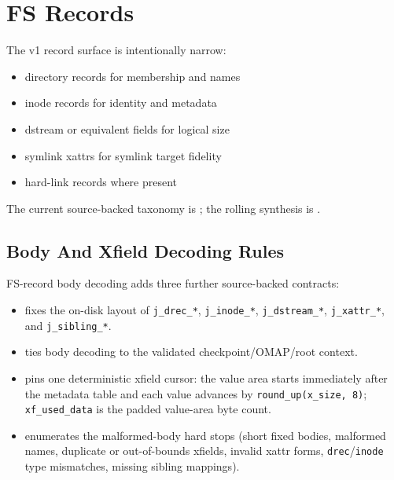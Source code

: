 \section{FS Records}

The v1 record surface is intentionally narrow:

\begin{itemize}
  \item directory records for membership and names
  \item inode records for identity and metadata
  \item dstream or equivalent fields for logical size
  \item symlink xattrs for symlink target fidelity
  \item hard-link records where present
\end{itemize}

The current source-backed taxonomy is
; the rolling synthesis
is .

\subsection{Body And Xfield Decoding Rules}

FS-record body decoding adds three further source-backed contracts:

\begin{itemize}
  \item {} fixes the
  on-disk layout of \texttt{j\_drec\_*}, \texttt{j\_inode\_*},
  \texttt{j\_dstream\_*}, \texttt{j\_xattr\_*}, and \texttt{j\_sibling\_*}.
  \item {}
  ties body decoding to the validated checkpoint/OMAP/root context.
  \item {}
  pins one deterministic xfield cursor: the value area starts immediately
  after the metadata table and each value advances by
  \texttt{round\_up(x\_size, 8)}; \texttt{xf\_used\_data} is the padded
  value-area byte count.
  \item {}
  enumerates the malformed-body hard stops (short fixed bodies, malformed
  names, duplicate or out-of-bounds xfields, invalid xattr forms,
  \texttt{drec}/\texttt{inode} type mismatches, missing sibling mappings).
\end{itemize}

